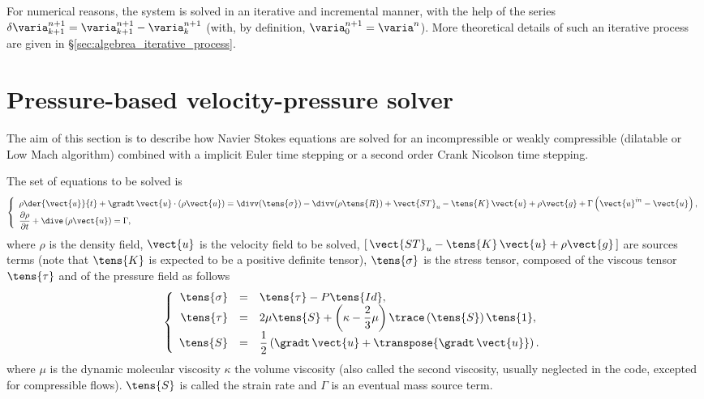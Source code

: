 For numerical reasons, the system is solved in an iterative and incremental
manner, with the help of the series $\delta \varia^{n+1}_{k+1}=\varia^{n+1}_{k+1}-\varia^{n+1}_{k}$ 
(with, by definition, $\varia^{n+1}_0=\varia^{n}$).
More theoretical details of such an iterative process are given in \S \ref{sec:algebrea_iterative_process}.

\section{Pressure-based velocity-pressure solver}
The aim of this section is to describe how Navier Stokes equations are solved for an incompressible 
or weakly compressible (dilatable or Low Mach algorithm) combined with a 
implicit Euler time stepping or a second order Crank Nicolson time stepping.

The set of equations to be solved is
\begin{equation}\label{eq:time_stepping_navier_stokes}
\left\{\begin{array}{l}
\displaystyle \rho \der{\vect{u}}{t} + \gradt \, \vect{u} \cdot \left( \rho\vect{u}  \right)
=\divv(\tens{\sigma}) - \divv(\rho \tens{R}) + \vect{ST}_u - \tens{K}\,\vect{u} + \rho \vect{g} + \Gamma \left( \vect{u}^{in} - \vect{u} \right), \\
\dfrac{\partial \rho}{\partial t} + \dive\left( \rho \vect{u} \right) = \Gamma ,
\end{array}\right.
\end{equation}
%
where $\rho$ is the density field, $\vect{u}$ is the velocity field to be solved,
$[\,\vect{ST}_u-\tens{K}\,\vect{u} + \rho \vect{g} \,]$  are sources terms (note that $\tens{K}$ is expected to be a positive definite tensor),
 $\tens{\sigma}$ is the stress tensor, composed of the viscous tensor $\tens{\tau}$ and of the pressure field as follows
\begin{equation}
\left\{\begin{array}{r c l}
\tens{\sigma} &=& \tens{\tau} - P\tens{Id} , \\%
\tens{\tau} & =& 2 \mu  \tens{S} +   \left( \kappa - \dfrac{2}{3}\mu \right)   \trace \left( \tens{S} \right) \tens{1} ,\\
\tens{S} &=& \dfrac{1}{2} \left( \gradt \, \vect{u}+\transpose{\gradt \, \vect{u}} \right) .
\end{array}\right.
\end{equation}
 where  $\mu$ is the dynamic molecular viscosity
 $\kappa$ the volume viscosity (also called the second viscosity, usually neglected in the code, excepted for compressible flows).
$\tens{S}$ is called the strain rate and  $\Gamma$ is an eventual mass source term.

